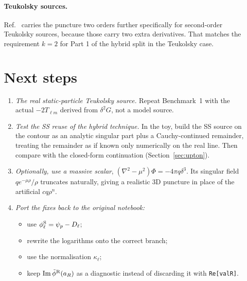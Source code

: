\documentclass[11pt,a4paper]{article}
\renewcommand{\Im}{\operatorname{Im}}
\newcommand{\phiS}{\phi^{\rm S}}
\newcommand{\code}[1]{\texttt{#1}}
\begin{document}
\paragraph{Teukolsky sources.}
Ref.~\cite{Upton2026} carries the puncture two orders further specifically for second-order Teukolsky sources, because those carry two extra derivatives.
That matches the requirement $k=2$ for Part 1 of the hybrid split in the Teukolsky case.

\clearpage
\section{Next steps}\label{sec:next}
\begin{enumerate}[nosep]
\item \emph{The real static-particle Teukolsky source.} Repeat Benchmark~1 with the actual $-2T_{\ell m}$ derived from $\delta^2G$, not a model source.
\item \emph{Test the SS reuse of the hybrid technique.} In the toy, build the SS source on the contour as an analytic singular part plus a Cauchy-continued remainder, treating the remainder as if known only numerically on the real line. Then compare with the closed-form continuation (Section~\ref{sec:upton}).
\item \emph{Optionally, use a massive scalar}, $(\nabla^2-\mu^2)\Phi=-4\pi q\delta^3$. Its singular field $qe^{-\mu\rho}/\rho$ truncates naturally, giving a realistic 3D puncture in place of the artificial $cq\rho^n$.
\item \emph{Port the fixes back to the original notebook:}
  \begin{itemize}[nosep]
  \item use $\phiS_\ell=\psi_p-D_\ell$;
  \item rewrite the logarithms onto the correct branch;
  \item use the normalisation $\kappa_\ell$;
  \item keep $\Im\tilde\phi^{\rm R}(a_R)$ as a diagnostic instead of discarding it with \code{Re[valR]}.
  \end{itemize}
\end{enumerate}
\end{document}
